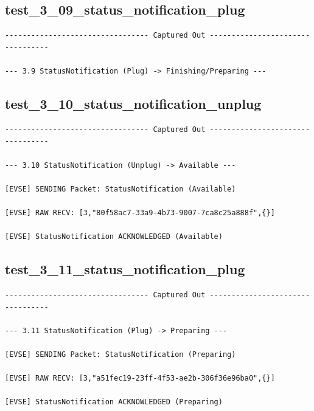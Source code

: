 \documentclass{article}
\begin{document}
\subsection*{test\_3\_09\_status\_notification\_plug}
\begin{lstlisting}
--------------------------------- Captured Out ---------------------------------

--- 3.9 StatusNotification (Plug) -> Finishing/Preparing ---
\end{lstlisting}
\subsection*{test\_3\_10\_status\_notification\_unplug}
\begin{lstlisting}
--------------------------------- Captured Out ---------------------------------

--- 3.10 StatusNotification (Unplug) -> Available ---

[EVSE] SENDING Packet: StatusNotification (Available)

[EVSE] RAW RECV: [3,"80f58ac7-33a9-4b73-9007-7ca8c25a888f",{}]

[EVSE] StatusNotification ACKNOWLEDGED (Available)
\end{lstlisting}
\subsection*{test\_3\_11\_status\_notification\_plug}
\begin{lstlisting}
--------------------------------- Captured Out ---------------------------------

--- 3.11 StatusNotification (Plug) -> Preparing ---

[EVSE] SENDING Packet: StatusNotification (Preparing)

[EVSE] RAW RECV: [3,"a51fec19-23ff-4f53-ae2b-306f36e96ba0",{}]

[EVSE] StatusNotification ACKNOWLEDGED (Preparing)
\end{lstlisting}
\end{document}
